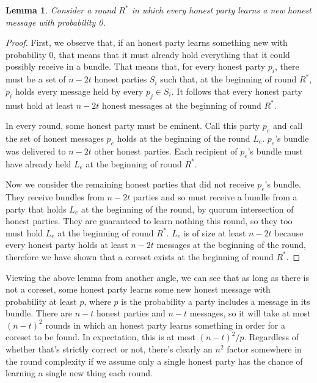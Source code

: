 \documentclass{article}
\newtheorem{lemma}{Lemma}
\begin{document}
\begin{lemma}
Consider a round $R^*$ in which every honest party learns a new honest message with probability 0.
\end{lemma}

\begin{proof}
First, we observe that, if an honest party learns something new with probability 0, that means that it must already hold everything that it could possibly receive in a bundle. That means that, for every honest party $p_i$, there must be a set of $n - 2t$ honest parties $S_i$ such that, at the beginning of round $R^*$, $p_i$ holds every message held by every $p_j \in S_i$. It follows that every honest party must hold at least $n - 2t$ honest messages at the beginning of round $R^*$. 

In every round, some honest party must be eminent. Call this party $p_e$ and call the set of honest messages $p_e$ holds at the beginning of the round $L_e$. $p_e$'s bundle was delivered to $n - 2t$ other honest parties. Each recipient of $p_e$'s bundle must have already held $L_e$ at the beginning of round $R^*$. 

Now we consider the remaining honest parties that did not receive $p_e$'s bundle. They receive bundles from $n - 2t$ parties and so must receive a bundle from a party that holds $L_e$ at the beginning of the round, by quorum intersection of honest parties. They are guaranteed to learn nothing this round, so they too must hold $L_e$ at the beginning of round $R^*$. $L_e$ is of size at least $n - 2t$ because every honest party holds at least $n -2t$ messages at the beginning of the round, therefore we have shown that a coreset exists at the beginning of round $R^*$.
\end{proof}

Viewing the above lemma from another angle, we can see that as long as there is not a coreset, some honest party learns some new honest message with probability at least $p$, where $p$ is the probability a party includes a message in its bundle. There are $n - t$ honest parties and $n - t$ messages, so it will take at most $(n - t)^2$ rounds in which an honest party learns something in order for a coreset to be found. In expectation, this is at most $(n - t)^2 / p$. Regardless of whether that's strictly correct or not, there's clearly an $n^2$ factor somewhere in the round complexity if we assume only a single honest party has the chance of learning a single new thing each round. 
\end{document}
